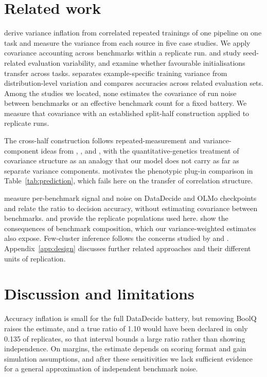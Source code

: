 \documentclass{article}
\begin{document}
\section{Related work}
\citet{bouthillier2021} derive variance inflation from correlated repeated trainings of one pipeline on one task and measure the variance from each source in five case studies. We apply covariance accounting across benchmarks within a replicate run. \citet{reimers2017} and \citet{madaan2024} study seed-related evaluation variability, and \citet{dodge2020} examine whether favourable initialisations transfer across tasks. \citet{jordan2024} separates example-specific training variance from distribution-level variation and compares accuracies across related evaluation sets. Among the studies we located, none estimates the covariance of run noise between benchmarks or an effective benchmark count for a fixed battery. We measure that covariance with an established split-half construction applied to replicate runs.

The cross-half construction follows repeated-measurement and variance-component ideas from \citet{spearman1904}, \citet{cronbach1951}, and \citet{searle1992}, with the quantitative-genetics treatment of covariance structure \citep{martin1977} as an analogy that our model does not carry as far as separate variance components. \citet{cheverud1988} motivates the phenotypic plug-in comparison in Table~\ref{tab:prediction}, which fails here on the transfer of correlation structure.

\citet{heineman2025} measure per-benchmark signal and noise on DataDecide and OLMo checkpoints and relate the ratio to decision accuracy, without estimating covariance between benchmarks. \citet{magnusson2025} and \citet{vanderwal2025} provide the replicate populations used here. \citet{dehghani2021} show the consequences of benchmark composition, which our variance-weighted estimates also expose. Few-cluster inference follows the concerns studied by \citet{cameron2008} and \citet{mackinnon2017}. Appendix~\ref{app:design} discusses further related approaches and their different units of replication.

\section{Discussion and limitations}
Accuracy inflation is small for the full DataDecide battery, but removing BoolQ raises the estimate, and a true ratio of 1.10 would have been declared in only 0.135 of replicates, so that interval bounds a large ratio rather than showing independence. On margins, the estimate depends on scoring format and gain simulation assumptions, and after these sensitivities we lack sufficient evidence for a general approximation of independent benchmark noise.
\end{document}
